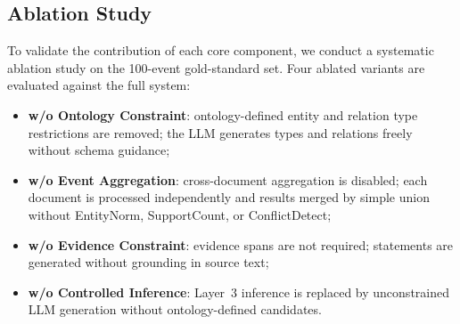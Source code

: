 \documentclass[a4paper,fleqn]{cas-dc}
\begin{document}
\begin{table}[t]
  \centering
  \caption{Ontology-guided inference performance (after
           adjudication).}
  \label{tab:inference}
  \footnotesize
  \setlength{\tabcolsep}{2.5pt}
\end{table}

\subsection{Ablation Study}
\label{sec:ablation}

To validate the contribution of each core component, we conduct a
systematic ablation study on the 100-event gold-standard set.
Four ablated variants are evaluated against the full system:

\begin{itemize}
  \item \textbf{w/o Ontology Constraint}: ontology-defined entity and
        relation type restrictions are removed; the LLM generates
        types and relations freely without schema guidance;
  \item \textbf{w/o Event Aggregation}: cross-document aggregation is
        disabled; each document is processed independently and results
        merged by simple union without EntityNorm, SupportCount, or
        ConflictDetect;
  \item \textbf{w/o Evidence Constraint}: evidence spans are not
        required; statements are generated without grounding in
        source text;
  \item \textbf{w/o Controlled Inference}: Layer~3 inference is
        replaced by unconstrained LLM generation without
        ontology-defined candidates.
\end{itemize}
\end{document}
